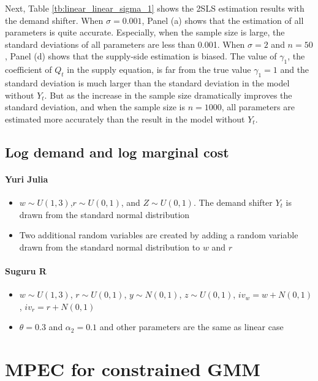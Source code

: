 \documentclass[11pt, a4paper]{article}
\begin{document}
Next, Table \ref{tb:linear_linear_sigma_1} shows the 2SLS estimation results with the demand shifter.
When $\sigma = 0.001$, Panel (a) shows that the estimation of all parameters is quite accurate.
Especially, when the sample size is large, the standard deviations of all parameters are less than 0.001.
When $\sigma = 2$ and $n = 50$, Panel (d) shows that the supply-side estimation is biased.
The value of $\gamma_1$, the coefficient  of $Q_t$ in the supply equation, is far from the true value $\gamma_1 = 1$ and the standard deviation is much larger than the standard deviation in the model without $Y_t$.
But as the increase in the sample size dramatically improves the standard deviation, and when the sample size is $n = 1000$, all parameters are estimated more accurately than the result in the model without $Y_t$.





\subsection{Log demand and log marginal cost}


\paragraph{Yuri Julia}
\begin{itemize}
    \item $w \sim U(1,3)$,$r \sim U(0,1)$, and $Z \sim U(0, 1)$. The demand shifter $Y_t$ is drawn from the standard normal distribution
    \item Two additional random variables are created by adding a random variable drawn from the standard normal distribution to $w$ and $r$
\end{itemize}



\paragraph{Suguru R}
\begin{itemize}
    \item $w\sim U(1,3) $, $r\sim U(0,1) $, $y\sim N(0,1) $, $z\sim U(0,1) $, $iv_{w}=w+N(0,1) $, $iv_{r}=r+N(0,1) $
    \item $\theta=0.3$ and $\alpha_2=0.1$ and other parameters are the same as linear case
\end{itemize}

\section{MPEC for constrained GMM}
\end{document}
